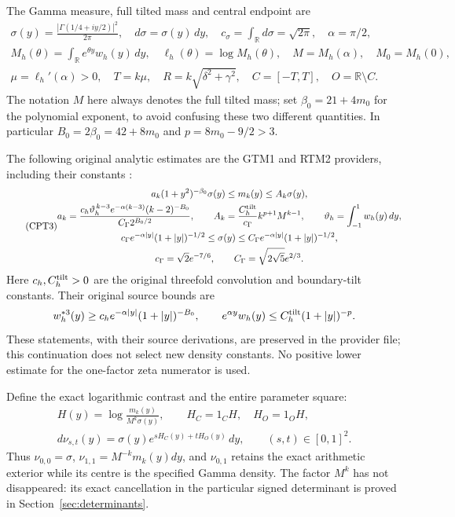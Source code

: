 \documentclass[11pt]{article}
\newcommand{\R}{\mathbb R}
\begin{document}
The Gamma measure, full tilted mass and central endpoint are
\begin{equation}\tag{CPT2}
\begin{gathered}
 \sigma(y)=\frac{|\Gamma(1/4+iy/2)|^2}{2\pi},\quad
 d\sigma=\sigma(y)\,dy,\quad c_\sigma=\int_{\R}d\sigma=\sqrt{2\pi},
 \quad \alpha=\pi/2,\\
 M_h(\theta)=\int_{\R}e^{\theta y}w_h(y)\,dy,\quad
 \ell_h(\theta)=\log M_h(\theta),\quad
 M=M_h(\alpha),\quad M_0=M_h(0),\\
 \mu=\ell_h'(\alpha)>0,\quad T=k\mu,\quad
 R=k\sqrt{\delta^2+\gamma^2},\quad
 C=[-T,T],\quad O=\R\setminus C.
\end{gathered}
\end{equation}
The notation \(M\) here always denotes the full tilted mass; set
\(\beta_0=21+4m_0\) for the polynomial exponent, to avoid confusing
these two different quantities.  In particular \(B_0=2\beta_0=42+8m_0\)
and \(p=8m_0-9/2>3\).

The following original analytic estimates are the GTM1 and RTM2
providers, including their constants \cite{providers}:
\begin{equation}\tag{CPT3}
\begin{gathered}
 a_k(1+y^2)^{-\beta_0}\sigma(y)\le m_k(y)\le A_k\sigma(y),\\
 a_k=
 \frac{c_h\vartheta_h^{\,k-3}e^{-\alpha(k-3)}(k-2)^{-B_0}}
 {C_\Gamma2^{B_0/2}},\qquad
 A_k=\frac{C_h^{\rm tilt}}{c_\Gamma}k^{p+1}M^{k-1},
 \qquad \vartheta_h=\int_{-1}^1w_h(y)\,dy,\\
 c_\Gamma e^{-\alpha|y|}(1+|y|)^{-1/2}
 \le\sigma(y)\le
 C_\Gamma e^{-\alpha|y|}(1+|y|)^{-1/2},\\
 c_\Gamma=\sqrt2e^{-7/6},\qquad
 C_\Gamma=\sqrt{2\sqrt5}e^{2/3}.
\end{gathered}
\end{equation}
Here \(c_h,C_h^{\rm tilt}>0\) are the original threefold convolution
and boundary-tilt constants.  Their original source bounds are
\[
 w_h^{*3}(y)\ge c_h e^{-\alpha|y|}(1+|y|)^{-B_0},
 \qquad e^{\alpha y}w_h(y)\le
 C_h^{\rm tilt}(1+|y|)^{-p}.
\]
These statements, with their source derivations, are preserved in the
provider file; this continuation does not select new density constants.
No positive lower estimate for the one-factor zeta numerator is used.

Define the exact logarithmic contrast and the entire parameter square:
\begin{equation}\tag{CPT4}
\begin{gathered}
 H(y)=\log\frac{m_k(y)}{M^k\sigma(y)},\qquad
 H_C=1_CH,\quad H_O=1_OH,\\
 d\nu_{s,t}(y)=\sigma(y)e^{sH_C(y)+tH_O(y)}\,dy,
 \qquad (s,t)\in[0,1]^2.
\end{gathered}
\end{equation}
Thus \(\nu_{0,0}=\sigma\), \(\nu_{1,1}=M^{-k}m_k(y)dy\), and
\(\nu_{0,1}\) retains the exact arithmetic exterior while its centre is
the specified Gamma density.  The factor \(M^k\) has not disappeared:
its exact cancellation in the particular signed determinant is proved
in Section~\ref{sec:determinants}.
\end{document}
